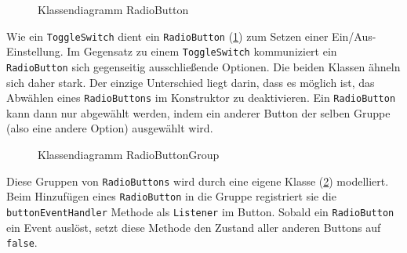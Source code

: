		\medskip
		\begin{figure}
			\caption{Klassendiagramm RadioButton}
			\label{uml-radiobutton}
		\end{figure}
		Wie ein \texttt{ToggleSwitch} dient ein \texttt{RadioButton} (\ref{uml-radiobutton}) zum Setzen einer Ein/Aus-Einstellung.
		Im Gegensatz zu einem \texttt{ToggleSwitch} kommuniziert ein \texttt{RadioButton} sich gegenseitig ausschließende Optionen.
		Die beiden Klassen ähneln sich daher stark. Der einzige Unterschied liegt darin, dass es möglich ist, das Abwählen eines
		\texttt{RadioButtons} im Konstruktor zu deaktivieren. Ein \texttt{RadioButton} kann dann nur abgewählt werden,
		indem ein anderer Button der selben Gruppe (also eine andere Option) ausgewählt wird.
		
		\medskip
		\begin{figure}
			\scalebox{0.75}{
				\begin{tikzpicture}
					
				\end{tikzpicture}
			}
			\caption{Klassendiagramm RadioButtonGroup}
			\label{uml-radiogroup}
		\end{figure}
		Diese Gruppen von \texttt{RadioButtons} wird durch eine eigene Klasse (\ref{uml-radiogroup}) modelliert.
		Beim Hinzufügen eines \texttt{RadioButton} in die Gruppe registriert sie die \texttt{buttonEventHandler} Methode als \texttt{Listener} im Button.
		Sobald ein \texttt{RadioButton} ein Event auslöst, setzt diese Methode den Zustand aller anderen Buttons auf \texttt{false}.
		
